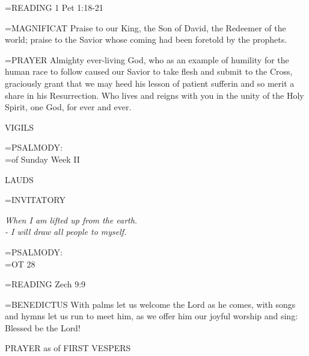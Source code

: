 \hangindent=\parindent \small{\uppercase{READING}}    1 Pet 1:18-21 \textbf{   \\}

\hangindent=\parindent \small{MAGNIFICAT 	Praise to our King, the Son of David, the Redeemer of the world; praise to the Savior whose coming had been foretold by the prophets.\\}

\hangindent=\parindent \small{PRAYER 	Almighty ever-living God, who as an example of humility for the human race to follow caused our Savior to take flesh and submit to the Cross, graciously grant that we may heed his lesson of patient sufferin and so merit a share in his Resurrection. Who lives and reigns with you in the unity of the Holy Spirit, one God, for ever and ever.}

\begin{flushleft}\normalsize VIGILS\\\end{flushleft}

\hangindent=\parindent \small{PSALMODY:}\\
\hangindent=\parindent  of Sunday Week II\vspace{0.5em}

\begin{flushleft}\normalsize LAUDS\\\end{flushleft}

\hangindent=\parindent \small{INVITATORY}
\begin{center}
\textit{When I am lifted up from the earth.\\}
\textit{- I will draw all people to myself.\\}
\end{center}

\hangindent=\parindent \small{PSALMODY:}\\
\hangindent=\parindent  OT 28\vspace{0.5em}


\hangindent=\parindent \small{\uppercase{READING}}    Zech 9:9 \textbf{   \\}

\hangindent=\parindent \small{BENEDICTUS 	With palms let us welcome the Lord as he comes, with songs and hymns let us run to meet him, as we offer him our joyful worship and sing: Blessed be the Lord!\\}

\begin{flushleft}\normalsize PRAYER as of FIRST VESPERS\\\end{flushleft}

